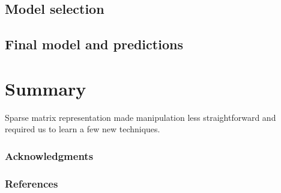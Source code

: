 \documentclass{article}
\begin{document}
   \subsection{Model selection}

  \subsection{Final model and predictions}



\section{Summary}
  Sparse matrix representation made manipulation less straightforward and required us to learn a few new techniques.

  \subsubsection*{Acknowledgments}

  \subsubsection*{References}
\end{document}
